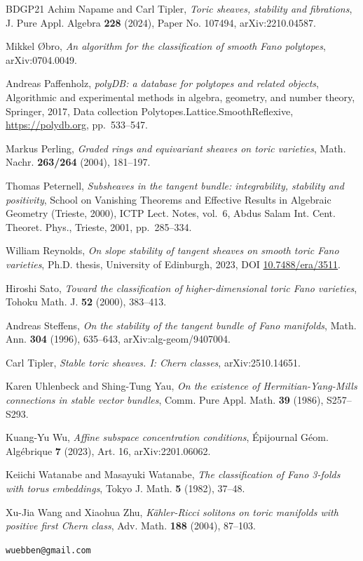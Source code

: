 \documentclass[11pt]{amsart}
\theoremstyle{definition}
\theoremstyle{remark}
\begin{document}
\begin{thebibliography}{BDGP21}
Achim Napame and Carl Tipler, \emph{Toric sheaves, stability and fibrations},
  J. Pure Appl. Algebra \textbf{228} (2024), Paper No. 107494,
  arXiv:2210.04587.

Mikkel {\O}bro, \emph{An algorithm for the classification of smooth {F}ano
  polytopes}, arXiv:0704.0049.

Andreas Paffenholz, \emph{poly{DB}: a database for polytopes and related
  objects}, Algorithmic and experimental methods in algebra, geometry, and
  number theory, Springer, 2017, Data collection
  \textsf{Polytopes.Lattice.SmoothReflexive}, \url{https://polydb.org},
  pp.~533--547.

Markus Perling, \emph{Graded rings and equivariant sheaves on toric varieties},
  Math. Nachr. \textbf{263/264} (2004), 181--197.

Thomas Peternell, \emph{Subsheaves in the tangent bundle: integrability,
  stability and positivity}, School on Vanishing Theorems and Effective
  Results in Algebraic Geometry (Trieste, 2000), ICTP Lect. Notes, vol.~6,
  Abdus Salam Int. Cent. Theoret. Phys., Trieste, 2001, pp.~285--334.

William Reynolds, \emph{On slope stability of tangent sheaves on smooth
  toric {F}ano varieties}, Ph.D. thesis, University of Edinburgh, 2023,
  DOI \href{https://doi.org/10.7488/era/3511}{10.7488/era/3511}.

Hiroshi Sato, \emph{Toward the classification of higher-dimensional toric
  {F}ano varieties}, Tohoku Math. J. \textbf{52} (2000), 383--413.

Andreas Steffens, \emph{On the stability of the tangent bundle of {F}ano
  manifolds}, Math. Ann. \textbf{304} (1996), 635--643, arXiv:alg-geom/9407004.

Carl Tipler, \emph{Stable toric sheaves. {I}: {C}hern classes},
  arXiv:2510.14651.

Karen Uhlenbeck and Shing-Tung Yau, \emph{On the existence of
  {H}ermitian-{Y}ang-{M}ills connections in stable vector bundles}, Comm. Pure
  Appl. Math. \textbf{39} (1986), S257--S293.

Kuang-Yu Wu, \emph{Affine subspace concentration conditions}, \'Epijournal
  G\'eom. Alg\'ebrique \textbf{7} (2023), Art. 16, arXiv:2201.06062.

Keiichi Watanabe and Masayuki Watanabe, \emph{The classification of {F}ano
  3-folds with torus embeddings}, Tokyo J. Math. \textbf{5} (1982), 37--48.

Xu-Jia Wang and Xiaohua Zhu, \emph{{K}\"ahler-{R}icci solitons on toric
  manifolds with positive first {C}hern class}, Adv. Math. \textbf{188} (2004),
  87--103.

\end{thebibliography}

\bigskip
{} \texttt{wuebben@gmail.com}
\end{document}
